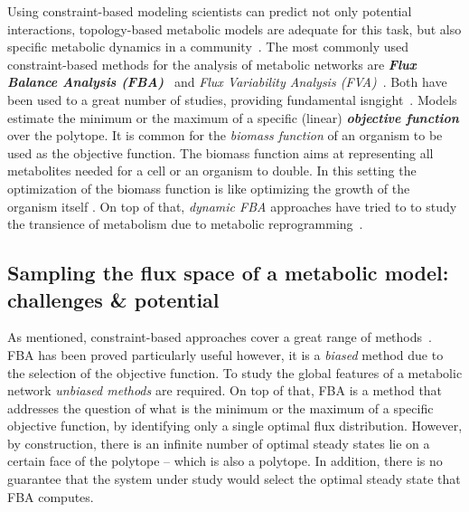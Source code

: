       Using constraint-based modeling scientists can 
      predict not only potential interactions,
      topology-based metabolic models are adequate for this task, 
      but also specific metabolic dynamics in a community~\cite{levy2012reverse}. 
      The most commonly used constraint-based methods for the analysis of metabolic networks
      are \textit{\textbf{Flux Balance Analysis (FBA)}}~\cite{orth2010flux} and 
      \textit{Flux Variability Analysis (FVA)}~\cite{gudmundsson2010computationally}.
      Both have been used to a great number of studies, providing fundamental isngight~\cite{ shastri2005flux,chapman2015flux}.
      Models estimate the minimum or the maximum of a specific (linear) \textit{\textbf{objective function}} over the polytope.
      It is common for the \textit{biomass function} of an
      organism to be used as the objective function.  
      The biomass function aims at representing all metabolites needed for a cell or an organism to double.
      In this setting the optimization of the biomass function is like optimizing the growth of the organism itself \cite{feist2010biomass}.
      On top of that, \textit{dynamic FBA} approaches
      have tried to to study the transience of metabolism 
      due to metabolic reprogramming~\cite{mahadevan2002dynamic}.


   \subsection{Sampling the flux space of a metabolic model: challenges \& potential}

      As mentioned, constraint-based approaches cover a great range of methods~\cite{lewis2012constraining}.
      FBA has been proved particularly useful
      however, 
      it is a \textit{biased} method due to the selection
      of the objective function. 
      To study the global features of a metabolic network
      \textit{unbiased methods} are required. 
      On top of that, FBA is a method that addresses the question 
      of what is the minimum or the maximum of a
      specific objective function,
      by identifying only a single optimal flux distribution.
      However, by construction, there is an infinite number of optimal steady states lie on a certain face of the polytope -- which is also a polytope. 
      In addition, there is no guarantee that the system under study would select 
      the optimal steady state that FBA computes.
      


